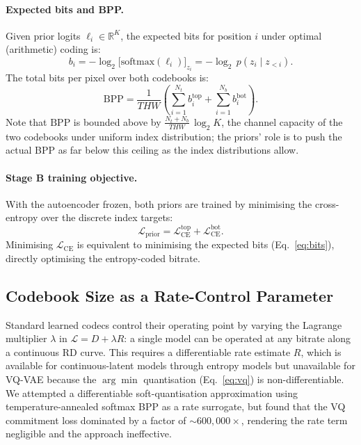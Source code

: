 \documentclass{article}
\begin{document}
\paragraph{Expected bits and BPP.}
Given prior logits $\boldsymbol{\ell}_i\in\mathbb{R}^K$, the expected bits
for position $i$ under optimal (arithmetic) coding is:
\begin{equation}
  b_i = -\log_2 \bigl[\mathrm{softmax}(\boldsymbol{\ell}_i)\bigr]_{z_i}
       = -\log_2\, p(z_i \mid z_{<i}).
\label{eq:bits}
\end{equation}
The total bits per pixel over both codebooks is:
\begin{equation}
  \mathrm{BPP} = \frac{1}{T H W}
    \left(\sum_{i=1}^{N_t} b_i^{\mathrm{top}}
    + \sum_{i=1}^{N_b} b_i^{\mathrm{bot}}\right).
\label{eq:bpp}
\end{equation}
Note that $\mathrm{BPP}$ is bounded above by
$\frac{N_t + N_b}{T H W}\,\log_2 K$, the channel capacity of the two
codebooks under uniform index distribution; the priors' role is to push
the actual BPP as far below this ceiling as the index distributions allow.

\paragraph{Stage B training objective.}
With the autoencoder frozen, both priors are trained by minimising the
cross-entropy over the discrete index targets:
\begin{equation}
  \mathcal{L}_\text{prior} = \mathcal{L}_\text{CE}^{\mathrm{top}}
  + \mathcal{L}_\text{CE}^{\mathrm{bot}}.
\end{equation}
Minimising $\mathcal{L}_\text{CE}$ is equivalent to minimising the expected
bits (Eq.~\ref{eq:bits}), directly optimising the entropy-coded bitrate.

\subsection{Codebook Size as a Rate-Control Parameter}
\label{sec:ksweep}

Standard learned codecs control their operating point by varying the
Lagrange multiplier $\lambda$ in $\mathcal{L} = D + \lambda R$: a single
model can be operated at any bitrate along a continuous RD curve.
This requires a differentiable rate estimate $R$, which is available for
continuous-latent models through entropy models but unavailable for VQ-VAE
because the $\arg\min$ quantisation (Eq.~\ref{eq:vq}) is non-differentiable.
We attempted a differentiable soft-quantisation approximation using
temperature-annealed softmax BPP as a rate surrogate, but found that the
VQ commitment loss dominated by a factor of $\sim\!600{,}000\times$,
rendering the rate term negligible and the approach ineffective.
\end{document}
